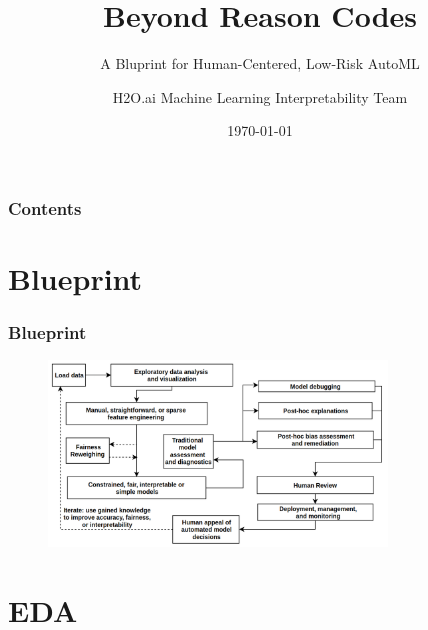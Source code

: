\documentclass[11pt,
               aspectratio=169,
               hyperref={colorlinks}
               ]{beamer}
\author{H2O.ai Machine Learning Interpretability Team}
\title{Beyond Reason Codes}
\subtitle{A Bluprint for Human-Centered, Low-Risk AutoML}
\institute{\href{https://www.h2o.ai}{H\textsubscript{2}O.ai}}
\date{\today}
\begin{document}
	
	\maketitle
	
	\begin{frame}
	
		\frametitle{Contents}
		
		\tableofcontents{}
		
	\end{frame}

	\section{Blueprint}
	
		\begin{frame}
		
			\frametitle{Blueprint}
				
			\begin{figure}[htb]
				\begin{center}
					\includegraphics[height=140pt]{img/blueprint.png}
					\label{fig:blueprint}
				\end{center}
			\end{figure}		
		
		\end{frame}


	\section{EDA}
	
\end{document}
